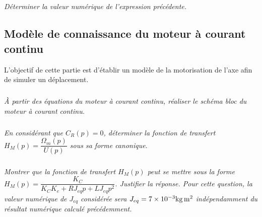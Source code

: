 \documentclass[10pt,fleqn]{article} %
\begin{document}
\begin{multicols}{2}
\subparagraph{}
\textit{Déterminer la valeur numérique de l’expression précédente.}

\subsection*{Modèle de connaissance du moteur à courant continu}
\begin{obj}
L’objectif de cette partie est d’établir un modèle de la motorisation de l’axe afin de simuler un déplacement.
\end{obj}

\subparagraph{}
\textit{À partir des équations du moteur à courant continu, réaliser le schéma bloc du moteur à courant continu.}

\subparagraph{}
\textit{En considérant que $C_R (p)=0$, déterminer la fonction de transfert $H_M (p)=\dfrac{\Omega_m (p)}{U(p)}$ sous sa forme canonique.}

\subparagraph{}
\textit{Montrer que la fonction de transfert $H_M (p)$ peut se mettre sous la forme $H_M (p)=\dfrac{K_C}{K_C K_e+RJ_{eq} p+LJ_{eq} p^2 }$. Justifier la réponse. Pour cette question, la valeur numérique de $J_{eq}$ considérée sera $J_{eq}=\num{7d-3}\si{kg.m^2}$ indépendamment du résultat numérique calculé précédemment.}
\end{multicols}
\end{document}
